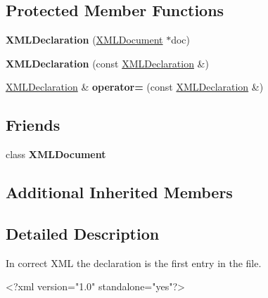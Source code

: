 \subsection*{Protected Member Functions}
\begin{DoxyCompactItemize}
\item 
\hypertarget{classtinyxml2_1_1_x_m_l_declaration_aef9586f2ce5df5feba74dde49a242b06}{{\bfseries X\-M\-L\-Declaration} (\hyperlink{classtinyxml2_1_1_x_m_l_document}{X\-M\-L\-Document} $\ast$doc)}\label{classtinyxml2_1_1_x_m_l_declaration_aef9586f2ce5df5feba74dde49a242b06}

\item 
\hypertarget{classtinyxml2_1_1_x_m_l_declaration_a5229cc0b31f034f93289af27ec3e2836}{{\bfseries X\-M\-L\-Declaration} (const \hyperlink{classtinyxml2_1_1_x_m_l_declaration}{X\-M\-L\-Declaration} \&)}\label{classtinyxml2_1_1_x_m_l_declaration_a5229cc0b31f034f93289af27ec3e2836}

\item 
\hypertarget{classtinyxml2_1_1_x_m_l_declaration_a79eb518c2c2b1b99a122a5d5a308b7ee}{\hyperlink{classtinyxml2_1_1_x_m_l_declaration}{X\-M\-L\-Declaration} \& {\bfseries operator=} (const \hyperlink{classtinyxml2_1_1_x_m_l_declaration}{X\-M\-L\-Declaration} \&)}\label{classtinyxml2_1_1_x_m_l_declaration_a79eb518c2c2b1b99a122a5d5a308b7ee}

\end{DoxyCompactItemize}
\subsection*{Friends}
\begin{DoxyCompactItemize}
\item 
\hypertarget{classtinyxml2_1_1_x_m_l_declaration_a4eee3bda60c60a30e4e8cd4ea91c4c6e}{class {\bfseries X\-M\-L\-Document}}\label{classtinyxml2_1_1_x_m_l_declaration_a4eee3bda60c60a30e4e8cd4ea91c4c6e}

\end{DoxyCompactItemize}
\subsection*{Additional Inherited Members}


\subsection{Detailed Description}
In correct X\-M\-L the declaration is the first entry in the file. \begin{DoxyVerb}    <?xml version="1.0" standalone="yes"?>
\end{DoxyVerb}


